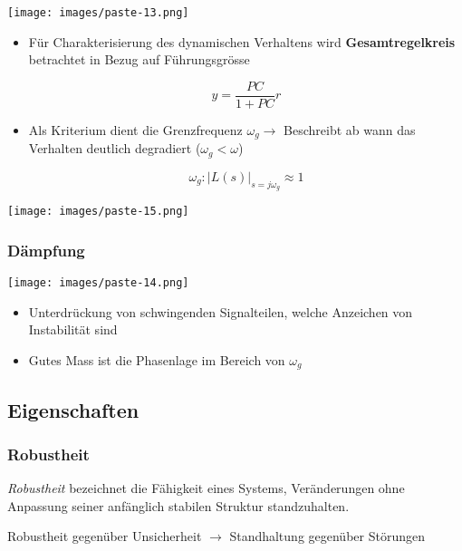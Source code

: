\documentclass[
  10pt,
  a4paper,
  twocolumn]{article}
\providecommand{\tightlist}{%
  \setlength{\itemsep}{0pt}\setlength{\parskip}{0pt}}\usepackage{longtable,booktabs,array}
\numberwithin{equation}{section}
\begin{document}
\begin{center}
\texttt{[image: images/paste-13.png]}
\end{center}

\begin{itemize}
\item
  Für Charakterisierung des dynamischen Verhaltens wird
  \textbf{Gesamtregelkreis} betrachtet in Bezug auf Führungsgrösse

  \[
  y = \frac{PC}{1+PC}r
  \]
\item
  Als Kriterium dient die Grenzfrequenz \(\omega_g \rightarrow\)
  Beschreibt ab wann das Verhalten deutlich degradiert
  (\(\omega_g<\omega\))

  \[
  \omega_g: \lvert L(s) \rvert_{s=j\omega_g}\approx 1
  \]
\end{itemize}

\texttt{[image: images/paste-15.png]}

\subsubsection{Dämpfung}\label{duxe4mpfung}

\begin{center}
\texttt{[image: images/paste-14.png]}
\end{center}

\begin{itemize}
\tightlist
\item
  Unterdrückung von schwingenden Signalteilen, welche Anzeichen von
  Instabilität sind
\item
  Gutes Mass ist die Phasenlage im Bereich von \(\omega_g\)
\end{itemize}

\subsection{Eigenschaften}\label{eigenschaften}

\subsubsection{Robustheit}\label{robustheit}

\emph{Robustheit} bezeichnet die Fähigkeit eines Systems, Veränderungen
ohne Anpassung seiner anfänglich stabilen Struktur standzuhalten.

Robustheit gegenüber Unsicherheit \(\rightarrow\) Standhaltung gegenüber
Störungen
\end{document}

